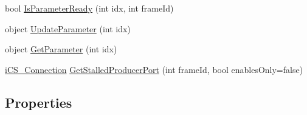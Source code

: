 \begin{DoxyCompactItemize}
\item 
bool \hyperlink{classi_c_s___signature_data_source_a3bee86cc5a6792bae1e33e78240816b3}{Is\+Parameter\+Ready} (int idx, int frame\+Id)
\item 
object \hyperlink{classi_c_s___signature_data_source_a15fce20094677a76d9e007b579713063}{Update\+Parameter} (int idx)
\item 
object \hyperlink{classi_c_s___signature_data_source_acea0dbbdde3258d3a62b57998d86cee4}{Get\+Parameter} (int idx)
\item 
\hyperlink{classi_c_s___connection}{i\+C\+S\+\_\+\+Connection} \hyperlink{classi_c_s___signature_data_source_a536677182b595d71f71f22ec15a78ef9}{Get\+Stalled\+Producer\+Port} (int frame\+Id, bool enables\+Only=false)
\end{DoxyCompactItemize}
\subsection*{Properties}
